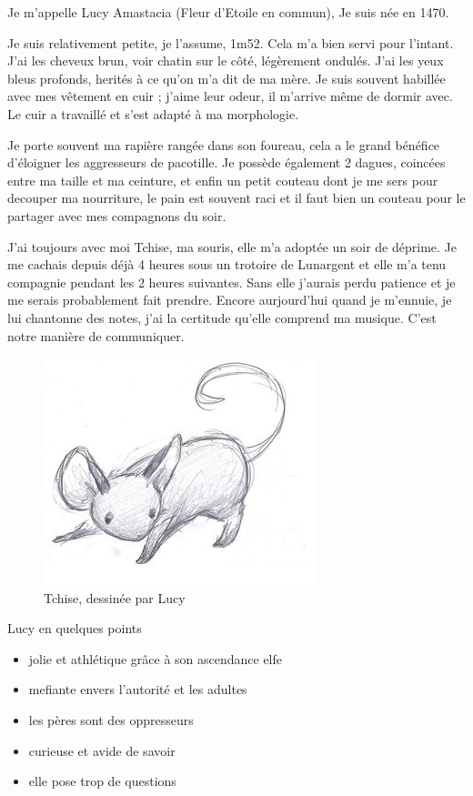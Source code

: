 \documentclass[10pt,a4paper,twoside,twocolumn,openany]{book}
\begin{document}
Je m'appelle Lucy Amastacia (Fleur d'Etoile en commun), Je suis née en 1470.

Je suis relativement petite, je l'assume, 1m52. Cela m'a bien servi
pour l'intant. J'ai les cheveux brun, voir chatin sur le côté, légèrement
ondulés. J'ai les yeux bleus profonds, herités à ce qu'on m'a dit de ma mère.
Je suis souvent habillée avec mes vêtement en cuir ; j'aime leur odeur, il m'arrive
même de dormir avec. Le cuir a travaillé et s'est adapté à ma morphologie.

Je porte souvent ma rapière rangée dans son foureau, cela a le grand bénéfice d'éloigner
les aggresseurs de pacotille. Je possède également 2 dagues, coincées
entre ma taille et ma ceinture, et enfin un petit couteau dont je me sers pour
decouper ma nourriture, le pain est souvent raci et il faut bien un couteau pour le partager
avec mes compagnons du soir.

J'ai toujours avec moi Tchise, ma souris, elle m'a adoptée un soir de déprime. Je me cachais
depuis déjà 4 heures sous un trotoire de Lunargent et elle m'a tenu compagnie pendant
les 2 heures suivantes. Sans elle j'aurais perdu patience et je me serais probablement
fait prendre. Encore aurjourd'hui quand je m'ennuie, je lui chantonne des notes, j'ai la
certitude qu'elle comprend ma musique. C'est notre manière de communiquer.

\begin{figure}[!h]
\centering
\includegraphics[scale=1]{tchise.png}
\caption*{Tchise, dessinée par Lucy}
\end{figure}

\begin{commentbox}{Lucy en quelques points}

\begin{itemize}
\item jolie et athlétique grâce à son ascendance elfe
\item mefiante envers l'autorité et les adultes
\item les pères sont des oppresseurs
\item curieuse et avide de savoir
\item elle pose trop de questions
\end{itemize}

\end{commentbox}
\end{document}
